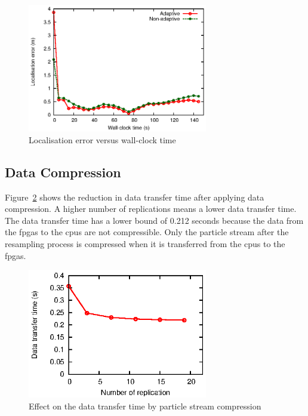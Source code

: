 \begin{figure}[t!]
\centering
\includegraphics[width=0.7\textwidth]{runtime_reconfiguration/figures/fig_error}
\caption{Localisation error versus wall-clock time}
\label{fig:error}
\end{figure}

\subsection{Data Compression}
Figure~\ref{fig:compression} shows the reduction in data transfer time after applying data compression.
A higher number of replications means a lower data transfer time.
The data transfer time has a lower bound of 0.212 seconds because the data from the \gls{fpga}s to the \gls{cpu}s are not compressible.
Only the particle stream after the resampling process is compressed when it is transferred from the \gls{cpu}s to the \gls{fpga}s.

\begin{figure}[t!]
\centering
\includegraphics[width=0.7\textwidth]{runtime_reconfiguration/figures/fig_compression}
\caption{Effect on the data transfer time by particle stream compression}
\label{fig:compression}
\end{figure}

